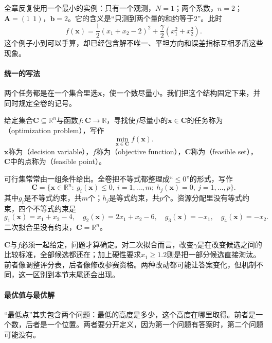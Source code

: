 全章反复使用一个最小的实例：只有一个观测，$N=1$；两个系数，$n=2$；$\bm{A}=(1\ \ 1)$，$\bm{b}=2$。它的含义是“只测到两个量的和约等于$2$”。此时
\begin{equation}
 f(\bm{x})=\frac12(x_1+x_2-2)^2+\frac{\gamma}{2}(x_1^2+x_2^2).
 \label{eq:opt-ridge-instance}
\end{equation}
这个例子小到可以手算，却已经包含解不唯一、平坦方向和误差指标互相矛盾这些现象。

\paragraph{统一的写法}
两个任务都是在一个集合里选$\bm{x}$，使一个数尽量小。我们把这个结构固定下来，并同时规定全卷的记号。

\begin{definition}[优化问题]
\label{def:opt-problem}
给定集合$\bm{C}\subseteq\mathbb{R}^n$与函数$f:\bm{C}\to\mathbb{R}$，寻找使$f$尽量小的$\bm{x}\in\bm{C}$的任务称为（optimization problem），写作
\begin{equation}
 \min_{\bm{x}\in\bm{C}}f(\bm{x}).
 \label{eq:opt-general}
\end{equation}
$\bm{x}$称为（decision variable），$f$称为（objective function），$\bm{C}$称为（feasible set），$\bm{C}$中的点称为（feasible point）。
\end{definition}

可行集常常由一组条件给出。全卷把不等式都整理成“$\leq0$”的形式，写作
\begin{equation}
 \bm{C}=\bigl\{\bm{x}\in\mathbb{R}^n:\ g_i(\bm{x})\leq0,\ i=1,\ldots,m;\ h_j(\bm{x})=0,\ j=1,\ldots,p\bigr\}.
 \label{eq:opt-constraint-form}
\end{equation}
其中$g_i$是不等式约束，共$m$个；$h_j$是等式约束，共$p$个。资源分配里没有等式约束，四个不等式约束是
\[
 g_1(\bm{x})=x_1+x_2-4,\quad g_2(\bm{x})=2x_1+x_2-6,\quad g_3(\bm{x})=-x_1,\quad g_4(\bm{x})=-x_2.
\]
二次拟合里没有约束，$\bm{C}=\mathbb{R}^n$。

$\bm{C}$与$f$必须一起给定，问题才算确定。对二次拟合而言，改变$\gamma$是在改变候选之间的比较标准，全部候选都还在；加上硬性要求$x_1\geq1.2$则是把一部分候选直接淘汰。前者像调整评分表，后者像修改参赛资格。两种改动都可能让答案变化，但机制不同，这一区别到本节末尾还会出现。

\paragraph{最优值与最优解}
“最低点”其实包含两个问题：最低的高度是多少，这个高度在哪里取得。前者是一个数，后者是一个位置。两者要分开定义，因为第一个问题有答案时，第二个问题可能没有。

